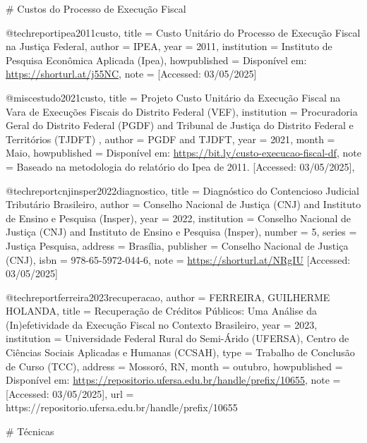 # Custos do Processo de Execução Fiscal

@techreport{ipea2011custo,
title = {{Custo Unitário do Processo de Execução Fiscal na Justiça Federal}},
author = {IPEA},
year = {2011},
institution = {{Instituto de Pesquisa Econômica Aplicada (Ipea)}},
howpublished = {Disponível em: \url{https://shorturl.at/j55NC}},
note = {[Accessed: 03/05/2025]}
}

@misc{estudo2021custo,
title = {{Projeto Custo Unitário da Execução Fiscal na Vara de Execuções Fiscais do Distrito Federal (VEF)}},
institution = {{Procuradoria Geral do Distrito Federal (PGDF) and Tribunal de Justiça do Distrito Federal e Territórios (TJDFT) }},
author = {PGDF and TJDFT},
year = {2021},
month = {Maio},
howpublished = {Disponível em: \url{https://bit.ly/custo-execucao-fiscal-df}},
note = {Baseado na metodologia do relatório do Ipea de 2011. [Accessed: 03/05/2025]},
}

@techreport{cnjinsper2022diagnostico,
  title = {{Diagnóstico do Contencioso Judicial Tributário Brasileiro}},
  author = {{Conselho Nacional de Justiça (CNJ) and Instituto de Ensino e Pesquisa (Insper)}},
  year = {2022},
  institution = {{Conselho Nacional de Justiça (CNJ) and Instituto de Ensino e Pesquisa (Insper)}},
  number = {5},
  series = {{Justiça Pesquisa}},
  address = {Brasília},
  publisher = {{Conselho Nacional de Justiça (CNJ)}},
  isbn = {978-65-5972-044-6},
  note = {\url{https://shorturl.at/NRgIU} [Accessed: 03/05/2025]}
}

@techreport{ferreira2023recuperacao,
  author = {FERREIRA, GUILHERME HOLANDA},
  title = {{Recuperação de Créditos Públicos: Uma Análise da (In)efetividade da Execução Fiscal no Contexto Brasileiro}},
  year = {2023},
  institution = {{Universidade Federal Rural do Semi-Árido (UFERSA), Centro de Ciências Sociais Aplicadas e Humanas (CCSAH)}},
  type = {{Trabalho de Conclusão de Curso (TCC)}},
  address = {Mossoró, RN},
  month = {outubro},
  howpublished = {Disponível em: \url{https://repositorio.ufersa.edu.br/handle/prefix/10655}},
  note = {[Accessed: 03/05/2025]},
  url = {https://repositorio.ufersa.edu.br/handle/prefix/10655}
}

# Técnicas